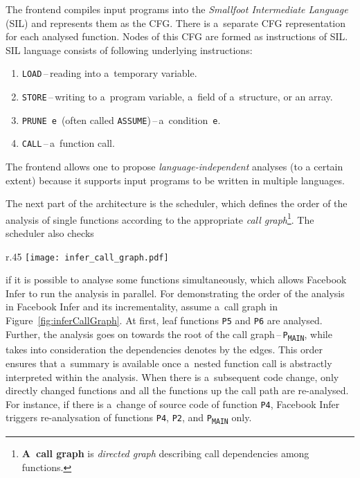 The frontend compiles input programs into the \emph{Smallfoot Intermediate
Language} (SIL) and represents them as the CFG. There is a~separate CFG
representation for each analysed function. Nodes of this CFG are formed as
instructions of SIL. SIL language consists of following underlying 
instructions:
\begin{enumerate}
    \item 
        \texttt{LOAD}\,--\,reading into a~temporary variable.
        
    \item 
        \texttt{STORE}\,--\,writing to a~program variable, 
        a~field of a~structure, or an array.
        
    \item 
        \texttt{PRUNE~e}~(often called 
        \texttt{ASSUME})\,--\,a~condition~\texttt{e}.
        
    \item 
        \texttt{CALL}\,--\,a~function call.
\end{enumerate}
The frontend allows one to propose \emph{language-independent} analyses 
(to a certain extent) because it supports input programs to be written 
in multiple languages. 

The next part of the architecture is the scheduler, which defines the 
order of the analysis of single functions according to the appropriate 
\emph{call graph}\footnote{\textbf{A~call graph} is \emph{directed graph}
describing call dependencies among functions.}. The scheduler also checks 
\begin{wrapfigure}{r}{.45 \linewidth}
    \centering
    \vspace{-.5em}
    \texttt{[image: infer\_call\_graph.pdf]}
    \caption{
        A~call graph for an illustration of Facebook Infer's
        analysis process~\cite{inferAISlides}, \cite{excel2019FBInfer},
        \cite{projectPracticeMarcin2018}
    }
    \label{fig:inferCallGraph}
\end{wrapfigure}
if it is possible to analyse some functions simultaneously, which allows 
Facebook Infer to run the analysis in parallel. For demonstrating the order 
of the analysis in Facebook Infer and its incrementality, assume a~call 
graph in Figure~\ref{fig:inferCallGraph}. At first, leaf functions 
\texttt{P5} and \texttt{P6} are analysed. Further, the analysis goes on 
towards the root of the call graph\,--\,\texttt{P\textsubscript{MAIN}}, 
while takes into consideration the dependencies denotes by the edges. This 
order ensures that a~summary is available once a~nested function call is
abstractly interpreted within the analysis. When there is a~subsequent code
change, only directly changed functions and all the functions up the call 
path are re-analysed. For instance, if there is a~change of source code of
function \texttt{P4}, Facebook Infer triggers re-analysation of functions
\texttt{P4}, \texttt{P2}, and \texttt{P\textsubscript{MAIN}} only. 

